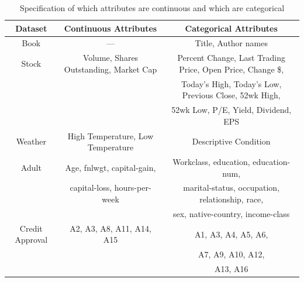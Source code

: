 \documentclass{acm_proc_article-sp}
\begin{document}
\begin{table}[t]
\small
\centering
\begin{tabular}{|c|c|c|}
\hline
\textbf{Dataset} & \bf Continuous Attributes & \bf  Categorical Attributes \\
\hline
Book & --- & Title, Author names \\
\hline
Stock & Volume, Shares Outstanding, Market Cap & Percent Change, Last Trading Price, Open Price, Change \$, \\
& &  Today's High,  Today's Low, Previous Close, 52wk High, \\
& & 52wk Low,  P/E, Yield, Dividend, EPS \\
\hline
Weather & High Temperature, Low Temperature & Descriptive Condition  \\
\hline
Adult & Age, fnlwgt, capital-gain, & Workclass, education, education-num,  \\
& capital-loss, hours-per-week & marital-status, occupation, relationship, race, \\
& & sex, native-country, income-class \\
\hline
Credit Approval &  A2, A3, A8, A11, A14, A15 & A1, A3, A4, A5, A6, \\
& & A7, A9, A10, A12, \\
& & A13, A16 \\
\hline
\end{tabular}
\caption{Specification of which attributes are continuous and which are categorical}
\label{fig:catcont}
\end{table}
\end{document}
